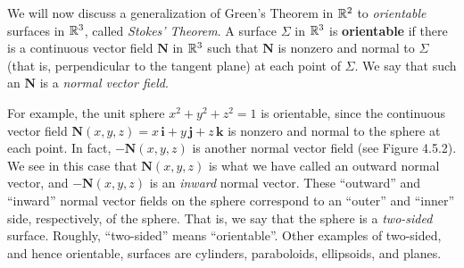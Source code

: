We will now discuss a generalization of Green's Theorem in $\mathbb{R}^{2}$ to \emph{orientable} surfaces in $\mathbb{R}^{3}$,
called \emph{Stokes' Theorem}. A surface $\Sigma$ in
$\mathbb{R}^{3}$ is \textbf{orientable} if there is a continuous vector field $\mathbf{N}$ in $\mathbb{R}^{3}$ such that
$\mathbf{N}$ is nonzero and normal to $\Sigma$ 
(that is, perpendicular to the tangent plane) 
at each point of $\Sigma$. 
We say that such an $\mathbf{N}$ is a \emph{normal vector field}.

\piccaption[]{}
For example, the unit sphere $x^2 + y^2 + z^2 = 1$ is orientable, since the continuous vector field
$\mathbf{N}(x,y,z) = x\,\mathbf{i} + y\,\mathbf{j} + z\,\mathbf{k}$ is nonzero and normal to the sphere at each point.
In fact, $-\mathbf{N}(x,y,z)$ is another normal vector field (see Figure 4.5.2). We see in this case that
$\mathbf{N}(x,y,z)$ is what we have called an outward normal vector, and $-\mathbf{N}(x,y,z)$ is an \emph{inward} normal
vector. These ``outward'' and ``inward'' normal vector fields on the sphere correspond to an ``outer'' and
``inner'' side, respectively, of the sphere.
That is, we say that the sphere is a \emph{two-sided} surface.
Roughly, ``two-sided'' means ``orientable''.
Other examples of two-sided, and hence orientable, surfaces are
cylinders, paraboloids, ellipsoids, and planes.

